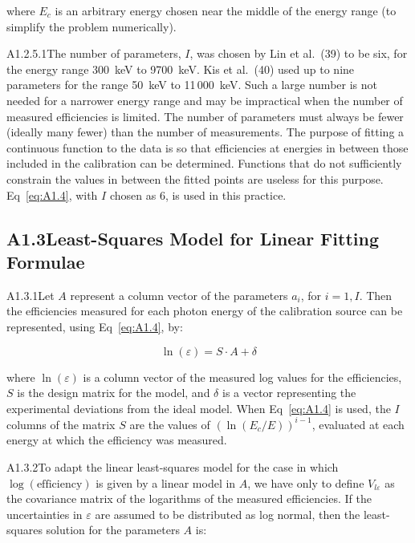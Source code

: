 \documentclass[12pt]{article}
\begin{document}
\noindent where $E_c$ is an arbitrary energy chosen near the middle of the energy range
(to simplify the problem numerically).

A1.2.5.1\quad The number of parameters, $I$, was chosen by Lin et al.~(39) to be six,
for the energy range 300~keV to 9700~keV. Kis et al.~(40) used up to nine parameters for
the range 50~keV to 11\,000~keV. Such a large number is not needed for a narrower energy
range and may be impractical when the number of measured efficiencies is limited. The
number of parameters must always be fewer (ideally many fewer) than the number of
measurements. The purpose of fitting a continuous function to the data is so that
efficiencies at energies in between those included in the calibration can be determined.
Functions that do not sufficiently constrain the values in between the fitted points are
useless for this purpose. Eq~\ref{eq:A1.4}, with $I$ chosen as 6, is used in this
practice.

\subsection*{A1.3\quad Least-Squares Model for Linear Fitting Formulae}

A1.3.1\quad Let $A$ represent a column vector of the parameters $a_i$, for $i = 1, I$.
Then the efficiencies measured for each photon energy of the calibration source can be
represented, using Eq~\ref{eq:A1.4}, by:

\begin{equation}
  \ln(\varepsilon) = S \cdot A + \delta
  \tag{A1.5}
  \label{eq:A1.5}
\end{equation}

\noindent where $\ln(\varepsilon)$ is a column vector of the measured log values for the
efficiencies, $S$ is the design matrix for the model, and $\delta$ is a vector
representing the experimental deviations from the ideal model. When Eq~\ref{eq:A1.4} is
used, the $I$ columns of the matrix $S$ are the values of $(\ln(E_c/E))^{i-1}$,
evaluated at each energy at which the efficiency was measured.

A1.3.2\quad To adapt the linear least-squares model for the case in which
$\log(\text{efficiency})$ is given by a linear model in $A$, we have only to define
$V_{l\varepsilon}$ as the covariance matrix of the logarithms of the measured
efficiencies. If the uncertainties in $\varepsilon$ are assumed to be distributed as log
normal, then the least-squares solution for the parameters $A$ is:
\end{document}

